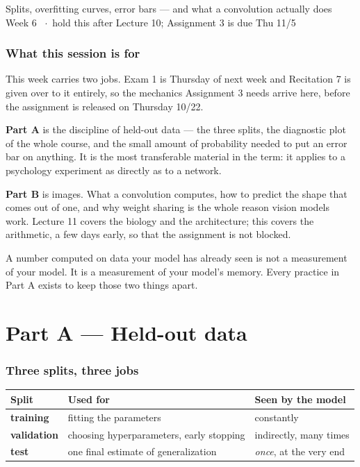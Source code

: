 \documentclass[11pt]{article}
\begin{document}
  {Splits, overfitting curves, error bars --- and what a convolution actually does}
  {Week 6 \ $\cdot$\ hold this after Lecture 10; Assignment 3 is due Thu 11/5}

\section*{What this session is for}

This week carries two jobs. Exam 1 is Thursday of next week and Recitation 7
is given over to it entirely, so the mechanics Assignment 3 needs arrive here,
before the assignment is released on Thursday 10/22.

\textbf{Part A} is the discipline of held-out data --- the three splits, the
diagnostic plot of the whole course, and the small amount of probability needed
to put an error bar on anything. It is the most transferable material in the
term: it applies to a psychology experiment as directly as to a network.

\textbf{Part B} is images. What a convolution computes, how to predict the shape
that comes out of one, and why weight sharing is the whole reason vision models
work. Lecture 11 covers the biology and the architecture; this covers the
arithmetic, a few days early, so that the assignment is not blocked.

\begin{keybox}
 A number computed on data your model has already seen is not
a measurement of your model. It is a measurement of your model's memory. Every
practice in Part A exists to keep those two things apart.
\end{keybox}

\part*{Part A --- Held-out data}

\section{Three splits, three jobs}

\begin{center}
\begin{tabular}{@{}lll@{}}
\toprule
Split & Used for & Seen by the model \\
\midrule
\textbf{training}   & fitting the parameters & constantly \\
\textbf{validation} & choosing hyperparameters, early stopping & indirectly, many times \\
\textbf{test}       & one final estimate of generalization & \emph{once}, at the very end \\
\bottomrule
\end{tabular}
\end{center}
\end{document}
